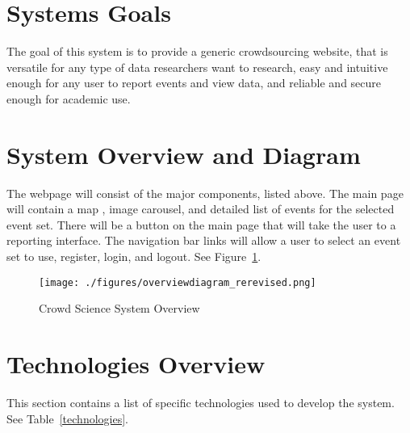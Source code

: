 \section{Systems Goals}
The goal of this system is to provide a generic crowdsourcing website, that is versatile for any type of data researchers want to research, easy and intuitive enough for any user to report events and view data, and reliable and secure enough for academic use.

\section{System Overview and Diagram}
The webpage will consist of the major components, listed above. The main page will contain a map , image carousel, and detailed list of events for the selected event set. There will be a button on the main page that will take the user to a reporting interface. The navigation bar links will allow a user to select an event set to use, register, login, and logout. See Figure~\ref{overviewdesign}.

\begin{figure}[tbhp!]
\begin{center}
\texttt{[image: ./figures/overviewdiagram\_rerevised.png]}
\end{center}
\caption{Crowd Science System Overview\label{overviewdesign}}
\end{figure}

\section{Technologies Overview}
This section contains a list of specific technologies used to develop the system.  See Table~\ref{technologies}.  

